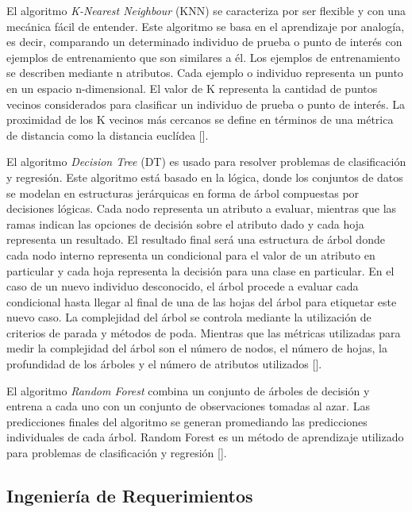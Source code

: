 \documentclass[journal]{IEEEtran}
\begin{document}
El algoritmo \textit{K-Nearest Neighbour} (KNN) se caracteriza por ser flexible y con una mecánica fácil de entender. Este algoritmo se basa en el aprendizaje por analogía, es decir, comparando un determinado individuo de prueba o punto de interés con ejemplos de entrenamiento que son similares a él. Los ejemplos de entrenamiento se describen mediante n atributos. Cada ejemplo o individuo representa un punto en un espacio n-dimensional. El valor de K representa la cantidad de puntos vecinos considerados para clasificar un individuo de prueba o  punto de interés. La proximidad de los K vecinos más cercanos se define en términos de una métrica de distancia como la distancia euclídea [].  

El algoritmo \textit{Decision Tree} (DT) es usado para resolver problemas de clasificación y regresión. Este algoritmo está basado en la lógica, donde los conjuntos de datos se modelan en estructuras jerárquicas en forma de árbol compuestas por decisiones lógicas. Cada nodo representa un atributo a evaluar, mientras que las ramas indican las opciones de decisión sobre el atributo dado y cada hoja representa un resultado. El resultado final será una estructura de árbol donde cada nodo interno representa un condicional para el valor de un atributo en particular y cada hoja representa la decisión para una clase en particular. En el caso de un nuevo individuo desconocido, el árbol procede a evaluar cada condicional hasta llegar al final de una de las hojas del árbol para etiquetar este nuevo caso. La complejidad del árbol se controla mediante la utilización de criterios de parada y métodos de  poda. Mientras que las métricas utilizadas para medir la complejidad del árbol son el número de nodos, el número de hojas, la profundidad de los árboles y el número de atributos utilizados []. 

El algoritmo \textit{Random Forest} combina un conjunto de árboles de decisión y entrena a cada uno con un conjunto de observaciones tomadas al azar. Las predicciones finales del algoritmo se generan promediando las predicciones individuales de cada árbol.  Random Forest es un método de aprendizaje utilizado para problemas de clasificación y regresión []. 

\subsection{Ingeniería de Requerimientos}
\end{document}
